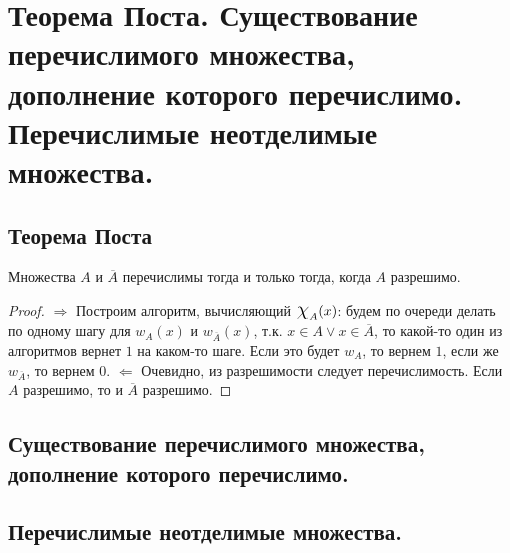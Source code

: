 \section{Теорема Поста. Существование перечислимого множества, дополнение которого перечислимо. Перечислимые неотделимые множества.}

\subsection{Теорема Поста}

\begin{theorem}
  Множества $A$ и $\overline{A}$ перечислимы тогда и только тогда, когда $A$ разрешимо.
  \begin{proof}
    $\Rightarrow$ \newline
    Построим алгоритм, вычисляющий $\mbox{\Large$\chi$}_A(x)$: будем по очереди делать по одному шагу для $w_A(x)$ и $w_{\overline{A}}(x)$, т.к. $x \in A \vee x \in \overline{A}$, то какой-то один из алгоритмов вернет $1$ на каком-то шаге. Если это будет $w_A$, то вернем $1$, если же $w_{\overline{A}}$, то вернем $0$. \newline
    $\Leftarrow$ \newline
    Очевидно, из разрешимости следует перечислимость. Если $A$ разрешимо, то и $\overline{A}$ разрешимо.
  \end{proof}
\end{theorem}

\subsection{Существование перечислимого множества, дополнение которого перечислимо.}


\subsection{Перечислимые неотделимые множества.}